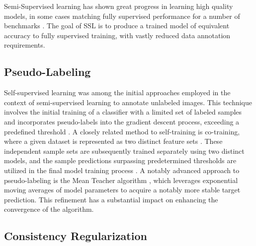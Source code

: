 \documentclass[10pt,twocolumn,letterpaper]{article}
\begin{document}


Semi-Supervised learning has shown great progress in learning high quality models, in some cases matching fully supervised performance for a number of benchmarks \cite{zhang2021flexmatch}.
The goal of SSL is to produce a trained model of equivalent accuracy to fully supervised training, with vastly reduced data annotation requirements.

\subsection{Pseudo-Labeling}
Self-supervised learning was among the initial approaches employed in the context of semi-supervised learning to annotate unlabeled images. 
This technique involves the initial training of a classifier with a limited set of labeled samples and incorporates pseudo-labels into the gradient descent process, exceeding a predefined threshold \cite{yarowsky1995unsupervised, mcclosky2006reranking, olivier2006semi,zhai2019s4l,livieris2019predicting,rosenberg2005semi,menon2020deep}. 
A closely related method to self-training is co-training, where a given dataset is represented as two distinct feature sets \cite{blum1998combining}. 
These independent sample sets are subsequently trained separately using two distinct models, and the sample predictions surpassing predetermined thresholds are utilized in the final model training process \cite{blum1998combining,prakash2014survey}.
A notably advanced approach to pseudo-labeling is the Mean Teacher algorithm \cite{tarvainen2017mean}, which leverages exponential moving averages of model parameters to acquire a notably more stable target prediction. 
This refinement has a substantial impact on enhancing the convergence of the algorithm.



\subsection{Consistency Regularization}
\end{document}
